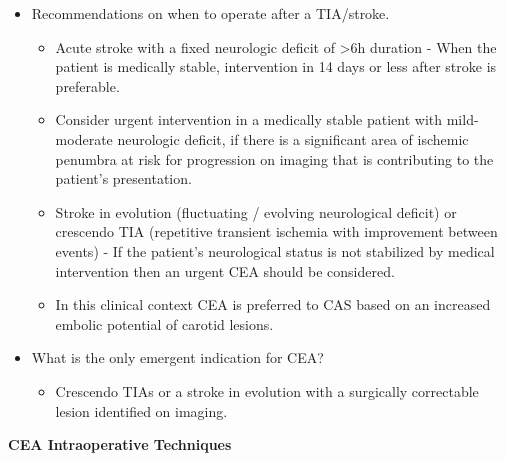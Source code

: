 \documentclass[
]{book}
\providecommand{\tightlist}{%
  \setlength{\itemsep}{0pt}\setlength{\parskip}{0pt}}
\begin{document}
\begin{itemize}
\item
  Recommendations on when to operate after a TIA/stroke.

  \begin{itemize}
  \item
    Acute stroke with a fixed neurologic deficit of \textgreater6h duration -
    When the patient is medically stable, intervention in 14 days or
    less after stroke is preferable.
    \citep{rothwellEndarterectomySymptomaticCarotid2004, meershoekTimingCarotidIntervention2018}
  \item
    Consider urgent intervention in a medically stable patient with
    mild-moderate neurologic deficit, if there is a significant area
    of ischemic penumbra at risk for progression on imaging that is
    contributing to the patient's presentation.
  \item
    Stroke in evolution (fluctuating / evolving neurological
    deficit) or crescendo TIA (repetitive transient ischemia with
    improvement between events) - If the patient's neurological
    status is not stabilized by medical intervention then an urgent
    CEA should be considered.
  \item
    In this clinical context CEA is preferred to CAS based on an
    increased embolic potential of carotid lesions.
    \citep{rantnerEarlyEndarterectomyCarries2017}
  \end{itemize}
\item
  What is the only emergent indication for CEA?

  \begin{itemize}
  \tightlist
  \item
    Crescendo TIAs or a stroke in evolution with a surgically
    correctable lesion identified on imaging.
  \end{itemize}
\end{itemize}

\textbf{CEA Intraoperative Techniques}
\end{document}
